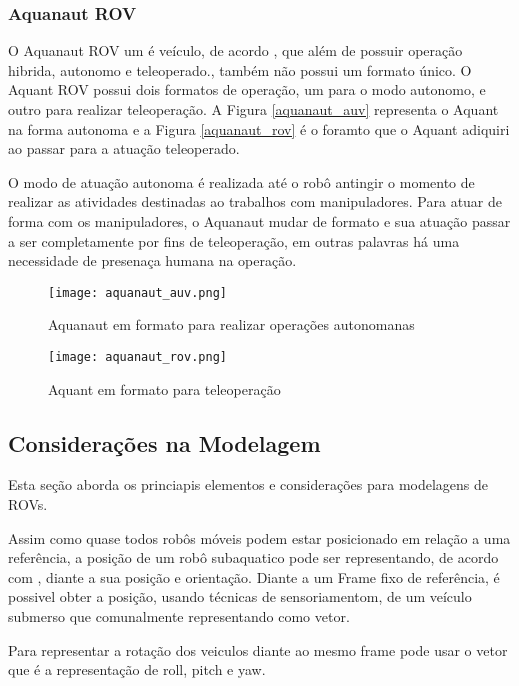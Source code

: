 \subsubsection{Aquanaut ROV}

O Aquanaut ROV um é veículo, de acordo \cite{Bogue1}, que além de possuir operação hibrida, autonomo e teleoperado., também não possui um formato único. O Aquant ROV possui dois formatos de operação, um para o modo autonomo, e outro para realizar teleoperação.
A Figura \ref{aquanaut_auv} representa o Aquant na forma autonoma e  a Figura \ref{aquanaut_rov} é o foramto que o Aquant adiquiri ao passar para a atuação teleoperado.

O modo de atuação autonoma é realizada até o robô antingir o momento de realizar as atividades destinadas ao trabalhos com manipuladores. Para atuar de forma com os manipuladores, o Aquanaut mudar de formato e sua atuação passar a ser completamente por fins de teleoperação, em outras palavras há uma necessidade de presenaça  humana na operação. 


\begin{figure}
  \centering 
  \texttt{[image: aquanaut\_auv.png]}
  \caption{Aquanaut em formato para realizar operações autonomanas}
  \label{fig:aquanaut_auv}
\end{figure}

\begin{figure}
  \centering 
  \texttt{[image: aquanaut\_rov.png]}
  \caption{Aquant em formato para teleoperação}
  \label{fig:aquanaut_rov}
\end{figure}



\subsection{Considerações na Modelagem}
Esta seção aborda os princiapis elementos e considerações para modelagens de ROVs.

Assim como quase todos robôs móveis podem estar posicionado em relação a uma referência, a posição de um robô subaquatico pode ser representando, de acordo com \cite{Antonelli}, diante a sua posição e orientação.
Diante a um Frame fixo de referência, é possivel obter a posição, usando técnicas de sensoriamentom, de um veículo submerso que comunalmente representando como vetor.

Para representar a rotação dos veiculos diante ao mesmo frame pode usar o vetor
que é a representação de roll, pitch  e yaw.

